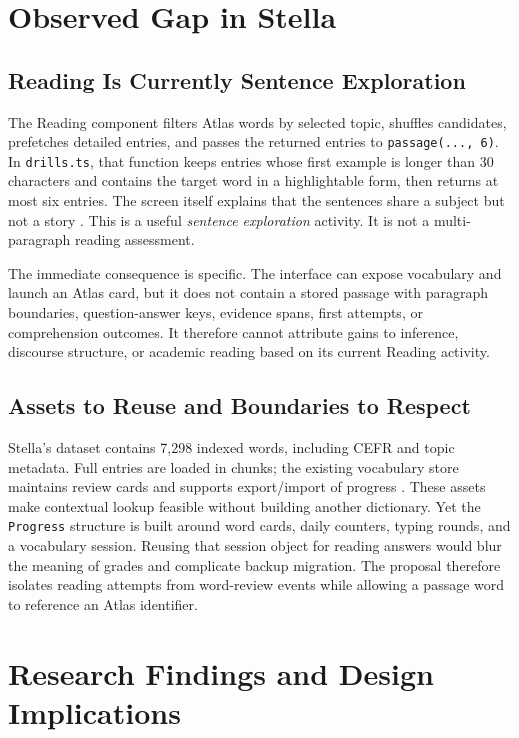\documentclass[conference,10pt]{IEEEtran}
\begin{document}
\section{Observed Gap in Stella}
\subsection{Reading Is Currently Sentence Exploration}
The Reading component filters Atlas words by selected topic, shuffles candidates, prefetches detailed entries, and passes the returned entries to \texttt{passage(..., 6)}. In \texttt{drills.ts}, that function keeps entries whose first example is longer than 30 characters and contains the target word in a highlightable form, then returns at most six entries. The screen itself explains that the sentences share a subject but not a story \cite{stellarepo}. This is a useful \emph{sentence exploration} activity. It is not a multi-paragraph reading assessment.

The immediate consequence is specific. The interface can expose vocabulary and launch an Atlas card, but it does not contain a stored passage with paragraph boundaries, question-answer keys, evidence spans, first attempts, or comprehension outcomes. It therefore cannot attribute gains to inference, discourse structure, or academic reading based on its current Reading activity.

\subsection{Assets to Reuse and Boundaries to Respect}
Stella's dataset contains 7,298 indexed words, including CEFR and topic metadata. Full entries are loaded in chunks; the existing vocabulary store maintains review cards and supports export/import of progress \cite{stellarepo}. These assets make contextual lookup feasible without building another dictionary. Yet the \texttt{Progress} structure is built around word cards, daily counters, typing rounds, and a vocabulary session. Reusing that session object for reading answers would blur the meaning of grades and complicate backup migration. The proposal therefore isolates reading attempts from word-review events while allowing a passage word to reference an Atlas identifier.

\section{Research Findings and Design Implications}
\end{document}
